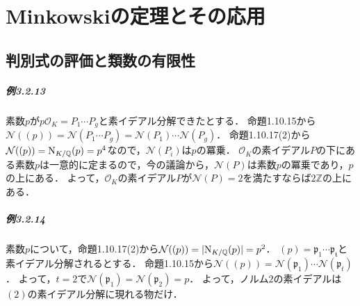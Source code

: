 \chapter{Minkowskiの定理とその応用}
\setcounter{section}{1}
\section{判別式の評価と類数の有限性}
\paragraph{例3.2.13}
素数$p$が$p\mathcal{O}_K=P_1\cdots P_g$と素イデアル分解できたとする．
命題1.10.15から$\mathcal{N}((p))=\mathcal{N}(P_1\cdots P_g)=\mathcal{N}(P_1)\cdots\mathcal{N}(P_g)$．
命題1.10.17(2)から$\mathcal{N}((p))=\operatorname{N}_{K/\mathbb{Q}}(p)=p^4$なので，$\mathcal{N}(P_i)$は$p$の冪乗．
$\mathcal{O}_K$の素イデアル$P$の下にある素数$p$は一意的に定まるので，今の議論から，$\mathcal{N}(P)$は素数$p$の冪乗であり，$p$の上にある．
よって，$\mathcal{O}_K$の素イデアル$P$が$\mathcal{N}(P)=2$を満たすならば$2\mathbb{Z}$の上にある．

\paragraph{例3.2.14}
素数$p$について，命題1.10.17(2)から$\mathcal{N}((p))=\lvert\operatorname{N}_{K/\mathbb{Q}}(p)\rvert=p^2$．
$(p)=\mathfrak{p}_1\cdots\mathfrak{p_t}$と素イデアル分解されるとする．
命題1.10.15から$\mathcal{N}((p))=\mathcal{N}(\mathfrak{p}_1)\cdots\mathcal{N}(\mathfrak{p}_t)$．
よって，$t=2$で$\mathcal{N}(\mathfrak{p}_1)=\mathcal{N}(\mathfrak{p}_2)=p$．
よって，ノルム$2$の素イデアルは$(2)$の素イデアル分解に現れる物だけ．

